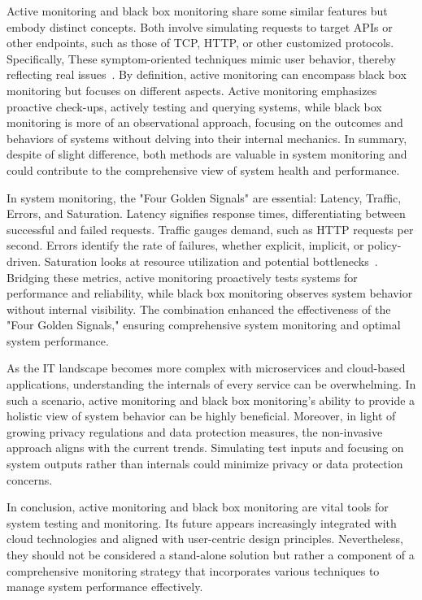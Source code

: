 Active monitoring and black box monitoring share some similar features but embody distinct concepts. Both involve simulating requests to target \ac{API}s or other endpoints, such as those of \ac{TCP}, \ac{HTTP}, or other customized protocols. Specifically, These symptom-oriented techniques mimic user behavior, thereby reflecting real issues~\parencite{beyerSiteReliabilityEngineering2016}. By definition, active monitoring can encompass black box monitoring but focuses on different aspects. Active monitoring emphasizes proactive check-ups, actively testing and querying systems, while black box monitoring is more of an observational approach, focusing on the outcomes and behaviors of systems without delving into their internal mechanics. In summary, despite of slight difference, both methods are valuable in system monitoring and could contribute to the comprehensive view of system health and performance. 

In system monitoring, the "Four Golden Signals" are essential: Latency, Traffic, Errors, and Saturation. Latency signifies response times, differentiating between successful and failed requests. Traffic gauges demand, such as HTTP requests per second. Errors identify the rate of failures, whether explicit, implicit, or policy-driven. Saturation looks at resource utilization and potential bottlenecks~\parencite{beyerSiteReliabilityEngineering2016}. Bridging these metrics, active monitoring proactively tests systems for performance and reliability, while black box monitoring observes system behavior without internal visibility. The combination enhanced the effectiveness of the "Four Golden Signals," ensuring comprehensive system monitoring and optimal system performance.

As the IT landscape becomes more complex with microservices and cloud-based applications, understanding the internals of every service can be overwhelming. In such a scenario, active monitoring and black box monitoring's ability to provide a holistic view of system behavior can be highly beneficial. Moreover, in light of growing privacy regulations and data protection measures, the non-invasive approach aligns with the current trends. Simulating test inputs and focusing on system outputs rather than internals could minimize privacy or data protection concerns. 

In conclusion, active monitoring and black box monitoring are vital tools for system testing and monitoring. Its future appears increasingly integrated with cloud technologies and aligned with user-centric design principles. Nevertheless, they should not be considered a stand-alone solution but rather a component of a comprehensive monitoring strategy that incorporates various techniques to manage system performance effectively. 

